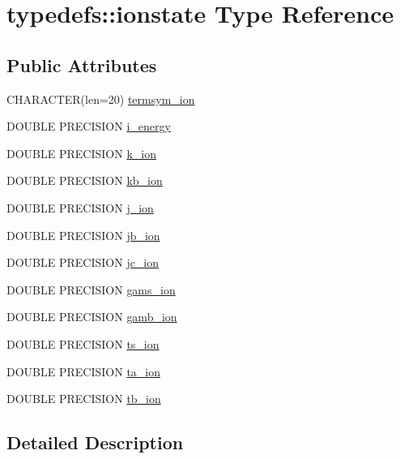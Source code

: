 \hypertarget{typetypedefs_1_1ionstate}{
\section{typedefs::ionstate Type Reference}
\label{typetypedefs_1_1ionstate}
}
\subsection*{Public Attributes}
\begin{DoxyCompactItemize}
\item 
CHARACTER(len=20) \hyperlink{typetypedefs_1_1ionstate_ac11d69f74d71d66d31101e69e2042532}{termsym\_\-ion}
\item 
DOUBLE PRECISION \hyperlink{typetypedefs_1_1ionstate_a170725c1bc6725e3f8704244cf96f166}{i\_\-energy}
\item 
DOUBLE PRECISION \hyperlink{typetypedefs_1_1ionstate_ab3ae6aade6de9efb14a7800bf0fa775a}{k\_\-ion}
\item 
DOUBLE PRECISION \hyperlink{typetypedefs_1_1ionstate_a9d7ea35f24152b9746a0ed12ac371811}{kb\_\-ion}
\item 
DOUBLE PRECISION \hyperlink{typetypedefs_1_1ionstate_acef241a8b7001c25ee9612dba4b5cc76}{j\_\-ion}
\item 
DOUBLE PRECISION \hyperlink{typetypedefs_1_1ionstate_ab6e13b95075b80113c61664876a1ee9b}{jb\_\-ion}
\item 
DOUBLE PRECISION \hyperlink{typetypedefs_1_1ionstate_a196abd455c2794532924827147606727}{jc\_\-ion}
\item 
DOUBLE PRECISION \hyperlink{typetypedefs_1_1ionstate_a8f8dbe19856ab70a19c441905ee7b18d}{gams\_\-ion}
\item 
DOUBLE PRECISION \hyperlink{typetypedefs_1_1ionstate_a6b061c6fbe4f2c7e5b16f8c09b173fd9}{gamb\_\-ion}
\item 
DOUBLE PRECISION \hyperlink{typetypedefs_1_1ionstate_adab9ef692d0747a3eb4a4ef3b14cea9f}{ts\_\-ion}
\item 
DOUBLE PRECISION \hyperlink{typetypedefs_1_1ionstate_a9e2f209a3ad264f417b44935a275e55b}{ta\_\-ion}
\item 
DOUBLE PRECISION \hyperlink{typetypedefs_1_1ionstate_a66ce379f0c85ec75599550df878e176f}{tb\_\-ion}
\end{DoxyCompactItemize}


\subsection{Detailed Description}



